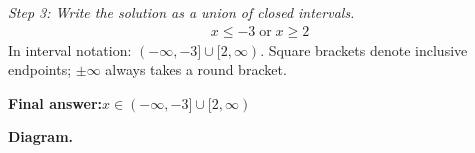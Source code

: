 \documentclass[11pt]{article}
\begin{document}
\textit{Step 3: Write the solution as a union of closed intervals.}
\[\begin{gathered}
x \leq -3 \;\text{or}\; x \geq 2
\end{gathered}\]
In interval notation: \( (-\infty, -3] \cup [2, \infty) \). Square brackets denote inclusive endpoints; \( \pm \infty \) always takes a round bracket.

\begin{answerbox}
\textbf{Final answer:}\quad \(\displaystyle x \in (-\infty, -3] \cup [2, \infty)\)
\end{answerbox}
\textbf{Diagram.}

\begin{center}
\end{center}
\end{document}
